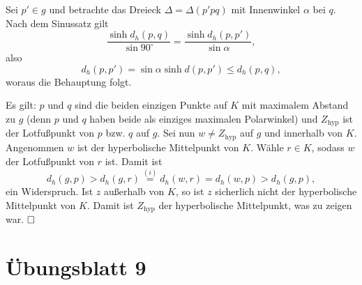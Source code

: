 \documentclass[11pt]{book}
\numberwithin{dummy}{section}
\theoremstyle{nonumberbreak}
\newenvironment{prob}[1][]{\ifthenelse{\equal{#1}{}}{\problem}{\problem[#1]}\rm}{\endproblem}
\newenvironment{sol}[1][]{\ifthenelse{\equal{#1}{}}{\solution}{\solution[#1]}\rm}{\endsolution}
\begin{document}
\begin{spacing}{1.4}
\begin{prob}
\begin{sol}
\begin{compactenum}
\item Sei $p' \in g$ und betrachte das Dreieck $\Delta= \Delta(p'pq)$ mit Innenwinkel $\alpha$ bei $q$. Nach dem Sinussatz gilt 
$$\frac{\sinh d_h(p,q)}{\sin 90^{\circ}} = \frac{\sinh d_h(p,p')}{\sin \alpha},$$
also 
$$d_h(p,p') = \sin \alpha \sinh d(p,p') \leqslant d_h(p,q),$$
woraus die Behauptung folgt. 
\item Es gilt: $p$ und $q$ sind die beiden einzigen Punkte auf $K$ mit maximalem Abstand zu $g$ (denn $p$ und $q$ haben beide als einziges maximalen Polarwinkel) und $Z_{\mathrm{hyp}}$ ist der Lotfußpunkt von $p$ bzw. $q$ auf $g$. Sei nun $w\neq Z_{\mathrm{hyp}}$ auf $g$ und innerhalb von $K$. Angenommen $w$ ist der hyperbolische Mittelpunkt von $K$. Wähle $r \in K$, sodass $w$ der Lotfußpunkt von $r$ ist. Damit ist 
$$d_h(g,p) > d_h(g,r) \overset{(i)}{=} d_h(w,r) = d_h(w,p) > d_h(g,p),$$
ein Widerspruch. Ist $z$ außerhalb von $K$, so ist $z$ sicherlich nicht der hyperbolische Mittelpunkt von $K$. Damit ist $Z_{\mathrm{hyp}}$ der hyperbolische Mittelpunkt, was zu zeigen war. $\hfill \Box$


\end{compactenum}
\end{sol}



\end{prob}




















\newpage




\titlespacing*{\section}{-16.5pt}{0pt}{20pt}
\renewcommand*\thesection{}
\section{Übungsblatt 9} %
\renewcommand*\thesection{\arabic{section}}




\begin{prob}    %


\end{prob}
\end{spacing}
\end{document}
